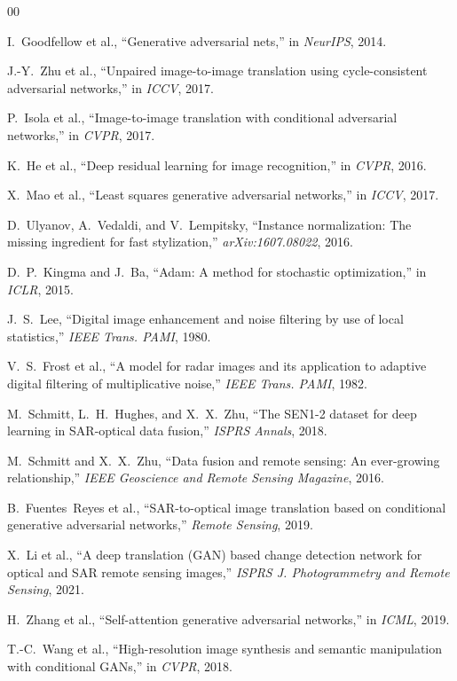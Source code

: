 \documentclass[conference]{IEEEtran}
\begin{document}
\begin{thebibliography}{00}

I.~Goodfellow et al., ``Generative adversarial nets,'' in \textit{NeurIPS}, 2014.

J.-Y.~Zhu et al., ``Unpaired image-to-image translation using cycle-consistent adversarial networks,'' in \textit{ICCV}, 2017.

P.~Isola et al., ``Image-to-image translation with conditional adversarial networks,'' in \textit{CVPR}, 2017.

K.~He et al., ``Deep residual learning for image recognition,'' in \textit{CVPR}, 2016.

X.~Mao et al., ``Least squares generative adversarial networks,'' in \textit{ICCV}, 2017.

D.~Ulyanov, A.~Vedaldi, and V.~Lempitsky, ``Instance normalization: The missing ingredient for fast stylization,'' \textit{arXiv:1607.08022}, 2016.

D.~P.~Kingma and J.~Ba, ``Adam: A method for stochastic optimization,'' in \textit{ICLR}, 2015.

J.~S.~Lee, ``Digital image enhancement and noise filtering by use of local statistics,'' \textit{IEEE Trans. PAMI}, 1980.

V.~S.~Frost et al., ``A model for radar images and its application to adaptive digital filtering of multiplicative noise,'' \textit{IEEE Trans. PAMI}, 1982.

M.~Schmitt, L.~H.~Hughes, and X.~X.~Zhu, ``The SEN1-2 dataset for deep learning in SAR-optical data fusion,'' \textit{ISPRS Annals}, 2018.

M.~Schmitt and X.~X.~Zhu, ``Data fusion and remote sensing: An ever-growing relationship,'' \textit{IEEE Geoscience and Remote Sensing Magazine}, 2016.

B.~Fuentes~Reyes et al., ``SAR-to-optical image translation based on conditional generative adversarial networks,'' \textit{Remote Sensing}, 2019.

X.~Li et al., ``A deep translation (GAN) based change detection network for optical and SAR remote sensing images,'' \textit{ISPRS J. Photogrammetry and Remote Sensing}, 2021.

H.~Zhang et al., ``Self-attention generative adversarial networks,'' in \textit{ICML}, 2019.

T.-C.~Wang et al., ``High-resolution image synthesis and semantic manipulation with conditional GANs,'' in \textit{CVPR}, 2018.

\end{thebibliography}
\end{document}
